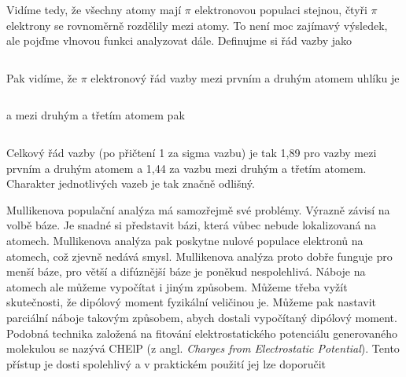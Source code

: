 Vidíme tedy, že všechny atomy mají $\pi$ elektronovou populaci stejnou, čtyři $\pi$ elektrony se rovnoměrně rozdělily mezi atomy. To není moc zajímavý výsledek, ale pojďme vlnovou funkci analyzovat dále. Definujme si řád vazby jako


\begin{equation}
\label{rov:XXX}
\end{equation}

Pak vidíme, že $\pi$ elektronový řád vazby mezi prvním a druhým atomem uhlíku je

\begin{equation}
\label{rov:XXX}
\end{equation}

\noindent a mezi druhým a třetím atomem pak


\begin{equation}
\label{rov:XXX}
\end{equation}


Celkový řád vazby (po přičtení 1 za sigma vazbu) je tak 1,89 pro vazby mezi prvním a druhým atomem a 1,44 za vazbu mezi druhým a třetím atomem. Charakter jednotlivých vazeb je tak značně odlišný.


Mullikenova populační analýza má samozřejmě své problémy. Výrazně závisí na volbě báze. Je snadné si představit bázi, která vůbec nebude lokalizovaná na atomech. Mullikenova analýza pak poskytne nulové populace elektronů na atomech, což zjevně nedává smysl. Mullikenova analýza proto dobře funguje pro menší báze, pro větší a difúznější báze je poněkud nespolehlivá. Náboje na atomech ale můžeme vypočítat i jiným způsobem. Můžeme třeba vyžít skutečnosti, že dipólový moment fyzikální veličinou je. Můžeme pak nastavit parciální náboje takovým způsobem, abych dostali vypočítaný dipólový moment. Podobná technika založená na fitování elektrostatického potenciálu generovaného molekulou se nazývá CHElP (z angl. \textit{Charges from Electrostatic Potential}). Tento přístup je dosti spolehlivý a v praktickém použití jej lze doporučit



   
         
   





      

 

